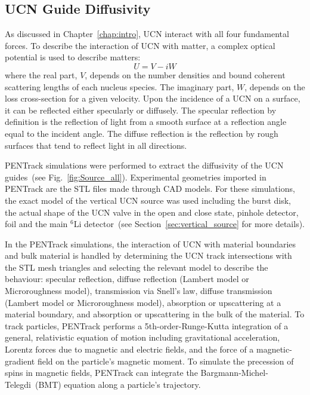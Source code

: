 \subsection{UCN Guide Diffusivity\label{sec:diffusivity}}
As discussed in Chapter~\ref{chap:intro}, UCN interact with all four
fundamental forces. To describe the interaction of UCN with matter, a
complex optical potential is used to describe matters:
\begin{equation}
  \label{eqn:fermipotential}
  U = V - iW
\end{equation}
where the real part, $V$, depends on the number densities and bound
coherent scattering lengths of each nucleus species. The imaginary
part, $W$, depends on the loss cross-section for a given velocity.
Upon the incidence of a UCN on a surface, it can be reflected either
specularly or diffusely. The specular reflection by definition is the
reflection of light from a smooth surface at a reflection angle equal
to the incident angle. The diffuse reflection is the reflection by
rough surfaces that tend to reflect light in all directions.

PENTrack simulations were performed to extract the diffusivity of the
UCN guides~(see Fig.~\ref{fig:Source_all}). Experimental geometries
imported in PENTrack are the STL files made through CAD models. For
these simulations, the exact model of the vertical UCN source was used
including the burst disk, the actual shape of the UCN valve in the
open and close state, pinhole detector, foil and the main $^6$Li
detector~(see Section~\ref{sec:vertical_source} for more details).



In the PENTrack simulations, the interaction of UCN with material
boundaries and bulk material is handled by determining the UCN track
intersections with the STL mesh triangles and selecting the relevant
model to describe the behaviour: specular reflection, diffuse
reflection (Lambert model or Microroughness model), transmission via
Snell's law, diffuse transmission (Lambert model or Microroughness
model), absorption or upscattering at a material boundary, and
absorption or upscattering in the bulk of the material. To track
particles, PENTrack performs a 5th-order-Runge-Kutta integration of a
general, relativistic equation of motion including gravitational
acceleration, Lorentz forces due to magnetic and electric fields, and
the force of a magnetic-gradient field on the particle’s magnetic
moment. To simulate the precession of spins in magnetic fields,
PENTrack can integrate the Bargmann-Michel-Telegdi~(BMT) equation
along a particle’s trajectory.

